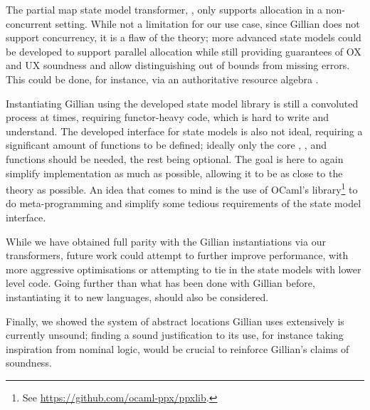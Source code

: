 The partial map state model transformer, \PMap, only supports allocation in a non-concurrent setting. While not a limitation for our use case, since Gillian does not support concurrency, it is a flaw of the theory; more advanced state models could be developed to support parallel allocation while still providing guarantees of OX and UX soundness and allow distinguishing out of bounds from missing errors. This could be done, for instance, via an authoritative resource algebra \cite{iris}.

Instantiating Gillian using the developed state model library is still a convoluted process at times, requiring functor-heavy code, which is hard to write and understand. The developed interface for state models is also not ideal, requiring a significant amount of functions to be defined; ideally only the core \execac, \consume, \produce{} and \fix{} functions should be needed, the rest being optional. The goal is here to again simplify implementation as much as possible, allowing it to be as close to the theory as possible. An idea that comes to mind is the use of OCaml's  library\footnote{See \url{https://github.com/ocaml-ppx/ppxlib}.} to do meta-programming and simplify some tedious requirements of the state model interface.

While we have obtained full parity with the Gillian instantiations via our transformers, future work could attempt to further improve performance, with more aggressive optimisations or attempting to tie in the state models with lower level code. Going further than what has been done with Gillian before, instantiating it to new languages, should also be considered.

Finally, we showed the system of abstract locations Gillian uses extensively is currently unsound; finding a sound justification to its use, for instance taking inspiration from nominal logic, would be crucial to reinforce Gillian's claims of soundness.
